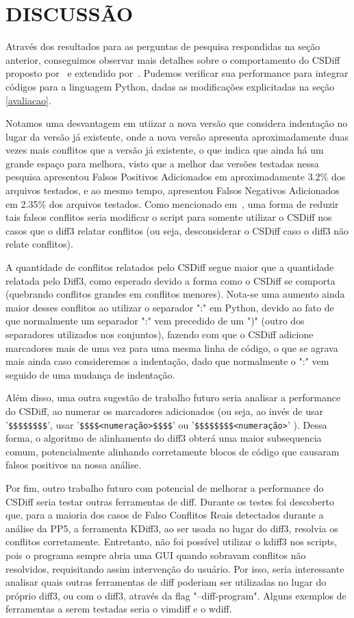 \section{DISCUSSÃO}\label{discussao}
Através dos resultados para as perguntas de pesquisa respondidas na seção anterior, conseguimos observar mais detalhes sobre o
comportamento do CSDiff proposto por~\citeauthor{clem21} e extendido por~\citeauthor{heitor21}. Pudemos verificar sua performance
para integrar códigos para a linguagem Python, dadas as modificações explicitadas na seção \ref{avaliacao}.

Notamos uma desvantagem em utiizar a nova versão que considera indentação no lugar da versão já existente, onde a nova versão
apresenta aproximadamente duas vezes mais conflitos que a versão já existente, o que indica que ainda há um grande espaço para
melhora, visto que a melhor das versões testadas nessa pesquisa apresentou Falsos Positivos Adicionados em aproximadamente
3.2\% dos arquivos testados, e ao mesmo tempo, apresentou Falsos Negativos Adicionados em 2.35\% dos arquivos testados.
Como mencionado em~\cite{heitor21}, uma forma de reduzir tais falsos conflitos seria modificar o script para somente utilizar
o CSDiff nos casos que o diff3 relatar conflitos (ou seja, desconsiderar o CSDiff caso o diff3 não relate conflitos).

A quantidade de conflitos relatados pelo CSDiff segue maior que a quantidade relatada pelo Diff3, como esperado devido a
forma como o CSDiff se comporta (quebrando conflitos grandes em conflitos menores). Nota-se uma aumento ainda maior desses conflitos
ao utilizar o separador ":" em Python, devido ao fato de que normalmente um separador ":" vem precedido de um ")" (outro
dos separadores utilizados nos conjuntos), fazendo com que o CSDiff adicione marcadores mais de uma vez para uma mesma linha
de código, o que se agrava mais ainda caso consideremos a indentação, dado que normalmente o ":" vem seguido de uma mudança
de indentação.

Além disso, uma outra sugestão de trabalho futuro seria analisar a performance do CSDiff, ao numerar os marcadores adicionados
(ou seja, ao invés de usar '\verb|$$$$$$$$|', usar '\verb|$$$$<numeração>$$$$|' ou '\verb|$$$$$$$$<numeração>|' ). Dessa forma, o
algoritmo de alinhamento do diff3 obterá uma maior subsequencia comum, potencialmente alinhando corretamente blocos de código que
causaram falsos positivos na nossa análise.

Por fim, outro trabalho futuro com potencial de melhorar a performance do CSDiff seria testar outras ferramentas de diff. Durante
os testes foi descoberto que, para a maioria dos casos de Falso Conflitos Reais detectados durante a análise da PP5,
a ferramenta KDiff3, %
ao ser usada no lugar do diff3, resolvia os conflitos corretamente. Entretanto, não foi possível utilizar o kdiff3 nos scripts,
pois o programa sempre abria uma GUI quando sobravam conflitos não resolvidos, requisitando assim intervenção do usuário. Por isso,
seria interessante analisar quais outras ferramentas de diff poderiam ser utilizadas no lugar do próprio diff3, ou com o diff3,
através da flag "--diff-program". Alguns exemplos de ferramentas a serem testadas seria o vimdiff e o wdiff.


